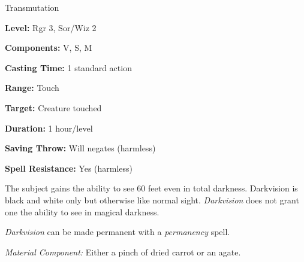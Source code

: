 
Transmutation

\textbf{Level:} Rgr 3, Sor/Wiz 2

\textbf{Components:} V, S, M

\textbf{Casting Time:} 1 standard action

\textbf{Range:} Touch

\textbf{Target:} Creature touched

\textbf{Duration:} 1 hour/level

\textbf{Saving Throw:} Will negates (harmless)

\textbf{Spell Resistance:} Yes (harmless)

The subject gains the ability to see 60 feet even in total darkness. Darkvision 
is black and white only but otherwise like normal sight. \textit{Darkvision} does 
not grant one the ability to see in magical darkness.

\textit{Darkvision} can be made permanent with a \textit{permanency} spell.

\textit{Material Component:} Either a pinch of dried carrot or an agate.

